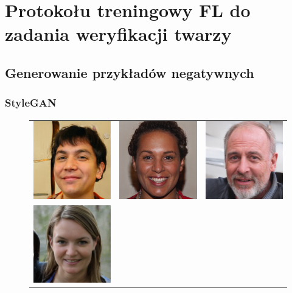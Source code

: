   \section{Protokołu treningowy FL do zadania weryfikacji twarzy}\label{sec:fedfaceid}
  \subsection{Generowanie przykładów negatywnych}
  \subsubsection{StyleGAN}
  \begin{figure}[H]
      \begin{center}
      \renewcommand\tabcolsep{1pt}
      \begin{tabular}{ccc}
        \includegraphics[width=.3\linewidth]{img/gen/1.png} &
        \includegraphics[width=.3\linewidth]{img/gen/2.png} &
        \includegraphics[width=.3\linewidth]{img/gen/3.png} \\
        \includegraphics[width=.3\linewidth]{img/gen/4.png} &

\end{tabular}
\end{center}
\end{figure}
